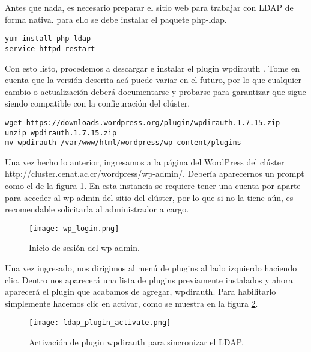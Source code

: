 Antes que nada, es necesario preparar el sitio web para trabajar con LDAP de forma nativa. para ello se debe instalar el paquete php-ldap.
\begin{lstlisting} 
yum install php-ldap
service httpd restart
\end{lstlisting}
Con esto listo,  procedemos a descargar e instalar el plugin wpdirauth \cite{pluginldap}. Tome en cuenta que la versión descrita acá puede variar en el futuro, por lo que  cualquier cambio o actualización deberá documentarse y probarse para garantizar que sigue siendo compatible con la configuración del clúster.
\begin{lstlisting} 
wget https://downloads.wordpress.org/plugin/wpdirauth.1.7.15.zip
unzip wpdirauth.1.7.15.zip
mv wpdirauth /var/www/html/wordpress/wp-content/plugins
\end{lstlisting}
Una vez hecho lo anterior, ingresamos a la página del WordPress del clúster \url{http://cluster.cenat.ac.cr/wordpress/wp-admin/}. Debería aparecernos un prompt como el de la figura \ref{fig:ldap:01}. En esta instancia se requiere tener una cuenta por aparte para acceder  al wp-admin del sitio del clúster, por lo que si no la tiene aún, es  recomendable solicitarla al administrador a cargo.
\begin{figure}[H]
\centering
\texttt{[image: wp\_login.png]}
\caption{Inicio de sesión del wp-admin.}
\label{fig:ldap:01}
\end{figure}
Una vez ingresado, nos dirigimos al menú de plugins al lado izquierdo haciendo clic. Dentro nos aparecerá una lista de plugins previamente instalados y ahora aparecerá el plugin que acabamos de agregar, wpdirauth. Para habilitarlo simplemente hacemos clic en activar, como se muestra en la figura \ref{fig:ldap:02}.
\begin{figure}[H]
\centering
\texttt{[image: ldap\_plugin\_activate.png]}
\caption{Activación de plugin wpdirauth para sincronizar el LDAP.}
\label{fig:ldap:02}
\end{figure}
